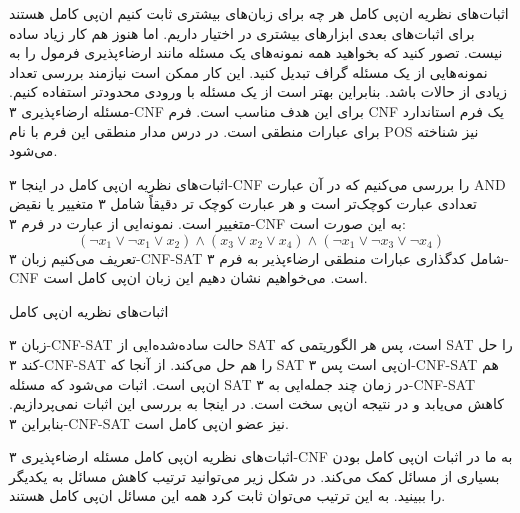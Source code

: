 \begin{itemframe}{اثبات‌های نظریه ان‌پی کامل}
\itm
هر چه برای زبان‌های بیشتری ثابت کنیم ان‌پی کامل هستند برای اثبات‌های بعدی ابزارهای بیشتری در اختیار داریم. اما هنوز هم کار زیاد ساده نیست.
\itm
تصور کنید که بخواهید همه نمونه‌های یک مسئله مانند ارضاءپذیری فرمول را به نمونه‌هایی از یک مسئله گراف تبدیل کنید. این کار ممکن است نیازمند بررسی تعداد زیادی از حالات باشد.
\itm
بنابراین بهتر است از یک مسئله با ورودی محدودتر استفاده کنیم. مسئله ارضاءپذیری ۳-CNF برای این هدف مناسب است.
\itm
فرم CNF یک فرم استاندارد برای عبارات منطقی است. در درس مدار منطقی این فرم با نام POS نیز شناخته می‌شود.
\end{itemframe}

\begin{itemframe}{اثبات‌های نظریه ان‌پی کامل}
\itm
در اینجا ۳-CNF را بررسی می‌کنیم که در آن عبارت AND تعدادی عبارت کوچک‌تر است و هر عبارت کوچک تر دقیقاً شامل ۳ متغییر یا نقیض متغییر است. نمونه‌ایی از عبارت در فرم ۳-CNF به این صورت است:
$$
(\lnot x_1 \lor \lnot x_1 \lor x_2) \land (x_3 \lor x_2 \lor x_4) \land (\lnot x_1 \lor \lnot x_3 \lor \lnot x_4)
$$
\itm
تعریف می‌کنیم زبان ۳-CNF-SAT شامل کدگذاری عبارات منطقی ارضاءپذیر به فرم ۳-CNF‌ است. می‌خواهیم نشان دهیم این زبان ان‌پی کامل است.
\end{itemframe}

\begin{itemframe}{اثبات‌های نظریه ان‌پی کامل}

 \itm
زبان ۳-CNF-SAT حالت ساد‌ه‌شده‌ایی از SAT است، پس هر الگوریتمی که SAT را حل کند ۳-CNF-SAT را هم حل می‌کند. از آنجا که SAT ان‌پی است پس ۳-CNF-SAT هم ان‌پی است.
 \itm
اثبات می‌شود که مسئله SAT در زمان چند جمله‌ایی به ۳-CNF-SAT کاهش می‌یابد و در نتیجه ان‌پی سخت است.
در اینجا به بررسی این اثبات نمی‌پردازیم.
 \itm
بنابراین ۳-CNF-SAT نیز عضو ان‌پی کامل است.
\end{itemframe}

\begin{itemframe}{اثبات‌های نظریه ان‌پی کامل}
 \itm
مسئله ارضاءپذیری ۳-CNF‌ به ما در اثبات ان‌پی کامل بودن بسیاری از مسائل کمک می‌کند. در شکل زیر می‌توانید ترتیب کاهش مسائل به یکدیگر را ببینید.
 \itm
به این ترتیب می‌توان ثابت کرد همه این مسائل ان‌پی کامل هستند.
\end{itemframe}